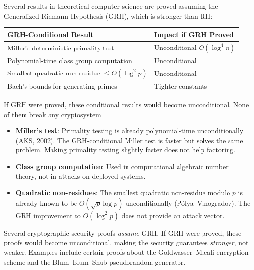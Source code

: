 \documentclass[11pt,a4paper]{article}
\begin{document}
Several results in theoretical computer science are proved
assuming the Generalized Riemann Hypothesis (GRH), which is
stronger than RH:

\begin{center}
\begin{tabular}{@{}ll@{}}
\toprule
\textbf{GRH-Conditional Result} & \textbf{Impact if GRH Proved} \\
\midrule
Miller's deterministic primality test & Unconditional $O(\log^4 n)$ \\
Polynomial-time class group computation & Unconditional \\
Smallest quadratic non-residue $\leq O(\log^2 p)$ & Unconditional \\
Bach's bounds for generating primes & Tighter constants \\
\bottomrule
\end{tabular}
\end{center}

If GRH were proved, these conditional results would become
unconditional. None of them break any cryptosystem:

\begin{itemize}
  \item \textbf{Miller's test}: Primality testing is already
    polynomial-time unconditionally (AKS, 2002). The GRH-conditional
    Miller test is faster but solves the same problem. Making
    primality testing slightly faster does not help factoring.
  \item \textbf{Class group computation}: Used in computational
    algebraic number theory, not in attacks on deployed systems.
  \item \textbf{Quadratic non-residues}: The smallest quadratic
    non-residue modulo $p$ is already known to be $O(\sqrt{p}\log p)$
    unconditionally (P\'olya--Vinogradov). The GRH improvement to
    $O(\log^2 p)$ does not provide an attack vector.
\end{itemize}

\begin{remark}
Several cryptographic security proofs \emph{assume} GRH. If GRH
were proved, these proofs would become unconditional, making the
security guarantees \emph{stronger}, not weaker. Examples include
certain proofs about the Goldwasser--Micali encryption scheme and
the Blum--Blum--Shub pseudorandom generator.
\end{remark}

\end{document}
